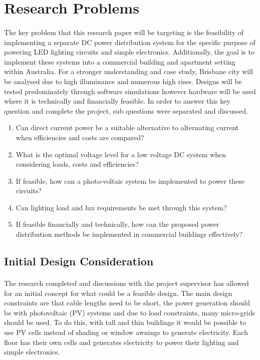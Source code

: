 
\section{Research Problems}

\paragraph{}
The key problem that this research paper will be targeting is the feasibility of implementing a separate DC power distribution system for the specific purpose of powering LED lighting circuits and simple electronics. Additionally, the goal is to implement these systems into a commercial building and apartment setting within Australia. For a stronger understanding and case study, Brisbane city will be analysed due to high illuminance and numerous high rises. Designs will be tested predominately through software simulations however hardware will be used where it is technically and financially feasible. In order to answer this key question and complete the project, sub questions were separated and discussed.

\begin{enumerate}
\itemsep-0.5em 
\item Can direct current power be a suitable alternative to alternating current when efficiencies and costs are compared?
\item What is the optimal voltage level for a low voltage DC system when considering loads, costs and efficiencies?
\item If feasible, how can a photo-voltaic system be implemented to power these circuits?
\item Can lighting load and lux requirements be met through this system?
\item If feasible financially and technically, how can the proposed power distribution methods be implemented in commercial buildings effectively?
\end{enumerate} 

\subsection{Initial Design Consideration}

\paragraph{}
The research completed and discussions with the project supervisor has allowed for an initial concept for what could be a feasible design. The main design constraints are that cable lengths need to be short, the power generation should be with photovoltaic (PV) systems and due to load constraints, many micro-grids should be used. To do this, with tall and thin buildings it would be possible to use PV cells instead of shading or window awnings to generate electricity. Each floor has their own cells and generates electricity to power their lighting and simple electronics. 

